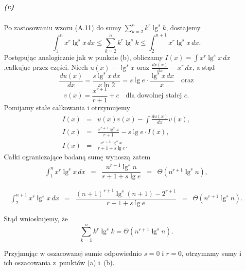 \subparagraph{(c)}
Po zastosowaniu wzoru (A.11) do sumy $\sum_{k=2}^nk^r\lg^sk$, dostajemy
\[
	\int_1^nx^r\lg^sx\,dx\le\sum_{k=2}^nk^r\lg^sk\le\int_2^{n+1}x^r\lg^sx\,dx.
\]
Postępując analogicznie jak w punkcie (b), obliczamy $I(x) = \int x^r\lg^sx\,dx$,\linebreak całkując przez części. Niech $u(x)=\lg^sx$ oraz $\frac{dv(x)}{dx}=x^r\,dx$, a stąd
\[
	\frac{du(x)}{dx} = \frac{s\lg^sx\,dx}{x\ln 2} = s\lg e\cdot\frac{\lg^sx\,dx}{x}\quad\mbox{oraz}
\]
\[
	v(x)=\frac{x^{r+1}}{r+1}+c\quad\mbox{dla dowolnej stałej }c.
\]
Pomijamy stałe całkowania i otrzymujemy
\begin{eqnarray*}
	I(x) &=& u(x)v(x)-\int\frac{du(x)}{dx}v(x), \\
	I(x) &=& \frac{x^{r+1}\lg^sx}{r+1}-s\lg e\cdot I(x), \\
	I(x) &=& \frac{x^{r+1}\lg^sx}{r+1+s\lg e}.
\end{eqnarray*}
Całki ograniczające badaną sumę wynoszą zatem
\[
	\begin{array}{ccccc}
		{\displaystyle \int_1^nx^r\lg^sx\,dx} &=& \dfrac{n^{r+1}\lg^sn}{r+1+s\lg e} &=& \Theta(n^{r+1}\lg^sn), \\\\
	\end{array}
\]
\[
	\begin{array}{ccccc}
		{\displaystyle \int_2^{n+1}x^r\lg^sx\,dx} &=& \dfrac{(n+1)^{r+1}\lg^s(n+1)-2^{r+1}}{r+1+s\lg e} &=& \Theta(n^{r+1}\lg^sn). \\\\
	\end{array}
\]
Stąd wnioskujemy, że
\[
	\sum_{k=1}^nk^r\lg^sk = \Theta(n^{r+1}\lg^sn).
\]

Przyjmując w oszacowanej sumie odpowiednio $s=0$ i $r=0$, otrzymamy sumy i ich oszacowania z~punktów (a) i~(b).

\endinput
